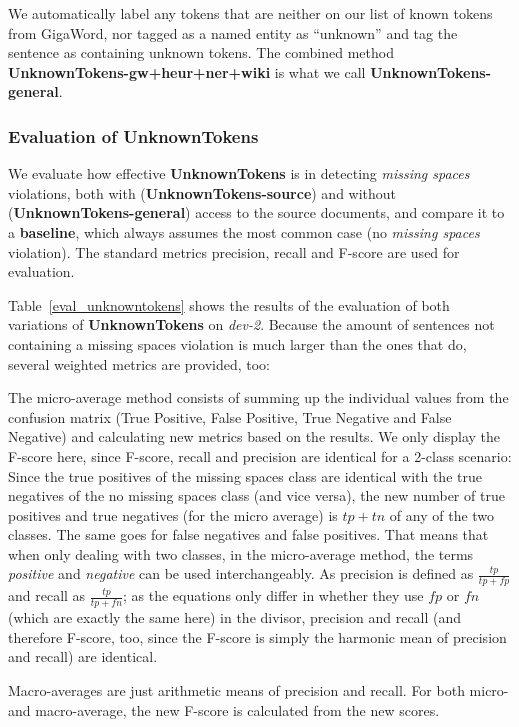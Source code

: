\documentclass[a4paper,10pt]{scrartcl}
\theoremstyle{style}
\begin{document}
We automatically label any tokens that are neither on our list of known tokens from GigaWord, nor tagged as a named entity as ``unknown'' and tag the sentence as containing unknown tokens. The combined method \textbf{UnknownTokens-gw+heur+ner+wiki} is what we call \textbf{UnknownTokens-general}.

\subsubsection{Evaluation of UnknownTokens}
We evaluate how effective \textbf{UnknownTokens} is in detecting \textit{missing spaces} violations, both with (\textbf{UnknownTokens-source}) and without (\textbf{UnknownTokens-general}) access to the source documents, and compare it to a \textbf{baseline}, which always assumes the most common case (no \textit{missing spaces} violation).
The standard metrics precision, recall and F-score are used for evaluation.

Table~\ref{eval_unknowntokens} shows the results of the evaluation of both variations of \textbf{UnknownTokens} on \textit{dev-2}. Because the amount of sentences not containing a missing spaces violation is much larger than the ones that do, several weighted metrics are provided, too:

The micro-average method consists of summing up the individual values from the confusion matrix (True Positive, False Positive, True Negative and False Negative) and calculating new metrics based on the results. We only display the F-score here, since F-score, recall and precision are identical for a 2-class scenario: Since the true positives of the missing spaces class are identical with the true negatives of the no missing spaces class (and vice versa), the new number of true positives and true negatives (for the micro average) is $tp + tn$ of any of the two classes. The same goes for false negatives and false positives. That means that when only dealing with two classes, in the micro-average method, the terms \textit{positive} and \textit{negative} can be used interchangeably. As precision is defined as $\frac{tp}{tp+fp}$ and recall as $\frac{tp}{tp+fn}$; as the equations only differ in whether they use $fp$ or $fn$ (which are exactly the same here) in the divisor, precision and recall (and therefore F-score, too, since the F-score is simply the harmonic mean of precision and recall) are identical.

Macro-averages are just arithmetic means of precision and recall. For both micro- and macro-average, the new F-score is calculated from the new scores.
\end{document}
